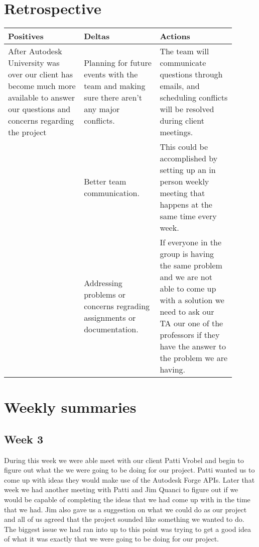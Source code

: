 \documentclass[10pt,draftclsnofoot,onecolumn]{IEEEtran}
\begin{document}
\section{Retrospective}

\begin{center}
\begin{tabular}{ |p{0.3\linewidth}|p{0.3\linewidth}|p{0.3\linewidth}| } 
 \hline
 \textbf{Positives} & Deltas & Actions \\ 
\hline
After Autodesk University was over our client has become much more available to answer our questions and concerns regarding the project & Planning for future events with the team and making sure there aren't any major conflicts. & The team will communicate questions through emails, and scheduling conflicts will be resolved during client meetings. \\
\hline
  & Better team communication. & This could be accomplished by setting up an in person weekly meeting that happens at the same time every week. \\
\hline 
  & Addressing problems or concerns regrading assignments or documentation. & If everyone in the group is having the same problem and we are not able to come up with a solution we need to ask our TA our one of the professors if they have the answer to the problem we are having. \\ 
 \hline
\end{tabular}
\end{center}


\section{Weekly summaries}
\subsection{Week 3}
During this week we were able meet with our client Patti Vrobel and begin to figure out what the we were going to be doing for our project. Patti wanted us to come up with ideas they would make use of the Autodesk Forge APIs. Later that week we had another meeting with Patti and Jim Quanci to figure out if we would be capable of completing the ideas that we had come up with in the time that we had. Jim also gave us a suggestion on what we could do as our project and all of us agreed that the project sounded like something we wanted to do. The biggest issue we had ran into up to this point was trying to get a good idea of what it was exactly that we were going to be doing for our project.   
\end{document}
